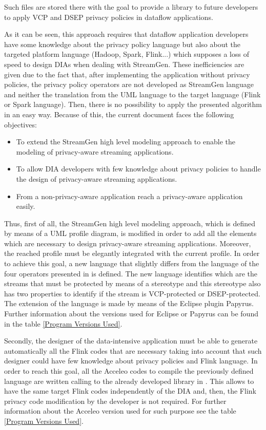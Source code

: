 Such files are stored there with the goal to provide a library to future developers to apply VCP and DSEP privacy policies in dataflow applications.

As it can be seen, this approach requires that dataflow application developers have some knowledge about the privacy policy language but also about the targeted platform language (Hadoop, Spark, Flink...) which supposes a loss of speed to design DIAs when dealing with StreamGen. These inefficiencies are given due to the fact that, after implementing the application without privacy policies, the privacy policy operators are not developed as StreamGen language and neither the translation from the UML language to the target language (Flink or Spark language). Then, there is no possibility to apply the presented algorithm in an easy way. Because of this, the current document faces the following objectives:

\begin{itemize}
\item To extend the StreamGen high level modeling approach to enable the modeling of privacy-aware streaming applications.
\item To allow DIA developers with few knowledge about privacy policies to handle the design of privacy-aware streaming applications.
\item From a non-privacy-aware application reach a privacy-aware application easily.
\end{itemize}

Thus, first of all, the StreamGen high level modeling approach, which is defined by means of a UML profile diagram, is modified in order to add all the elements which are necessary to design privacy-aware streaming applications. Moreover, the reached profile must be elegantly integrated with the current profile. In order to achieve this goal, a new language that slightly differs from the language of the four operators presented in \cite{privacypoliciesarticle} is defined. The new language identifies which are the streams that must be protected by means of a stereotype and this stereotype also has two properties to identify if the stream is VCP-protected or DSEP-protected. The extension of the language is made by means of the Eclipse plugin Papyrus. Further information about the versions used for Eclipse or Papyrus can be found in the table \ref{Program Versions Used}.

Secondly, the designer of the data-intensive application must be able to generate automatically all the Flink codes that are necessary taking into account that such designer could have few knowledge about privacy policies and Flink language. In order to reach this goal, all the Acceleo codes to compile the previously defined language are written calling to the already developed library in \cite{privacypoliciesarticle}. This allows to have the same target Flink codes independently of the DIA and, then, the Flink privacy code modification by the developer is not required. For further information about the Acceleo version used for such purpose see the table \ref{Program Versions Used}.

